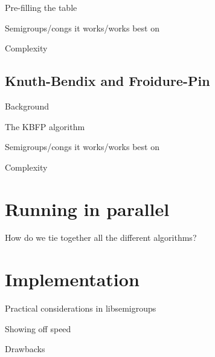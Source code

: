 Pre-filling the table

Semigroups/congs it works/works best on

Complexity

\subsection{Knuth-Bendix and Froidure-Pin}
\label{sec:kbfp}

Background

The KBFP algorithm

Semigroups/congs it works/works best on

Complexity

\section{Running in parallel}

How do we tie together all the different algorithms?

\section{Implementation}

Practical considerations in libsemigroups

Showing off speed

Drawbacks
